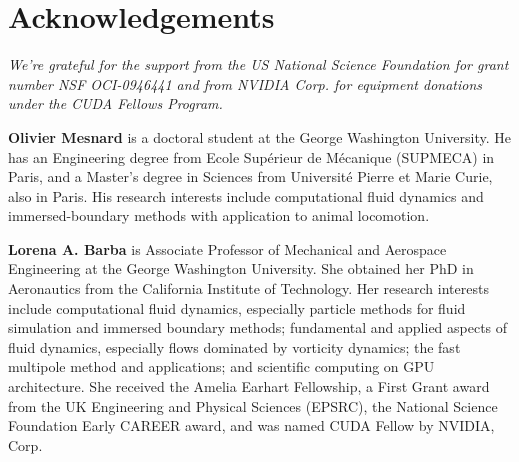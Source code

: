 \documentclass[9pt,twocolumn,twoside]{article}
\newlength{\up}
\begin{document}
\section*{Acknowledgements}
\vspace{\up}

{\sf \emph{We're grateful for the support from the US National Science Foundation for grant number NSF OCI-0946441 and from NVIDIA Corp. for equipment donations under the CUDA Fellows Program.}

\bigskip

}




\vspace{1cm}

\small
{\sf 


\noindent \textbf{Olivier Mesnard} is a doctoral student at the George Washington University. He has an Engineering degree from Ecole Sup{\'e}rieur de M{\'e}canique (SUPMECA) in Paris, and a Master's degree in Sciences from Universit{\'e} Pierre et Marie Curie, also in Paris.
His research interests include computational fluid dynamics and immersed-boundary methods with application to animal locomotion.
\bigskip

\noindent\textbf{Lorena A. Barba} is Associate Professor of Mechanical and Aerospace Engineering at the George Washington University.
She obtained her PhD in Aeronautics from the California Institute of Technology.
Her research interests include computational fluid dynamics, especially particle methods for fluid simulation and immersed boundary methods; fundamental and applied aspects of fluid dynamics, especially flows dominated by vorticity dynamics; the fast multipole method and applications; and scientific computing on GPU architecture. 
She received the Amelia Earhart Fellowship, a First Grant award from the UK Engineering and Physical Sciences (EPSRC), the National Science Foundation Early CAREER award, and was named CUDA Fellow by NVIDIA, Corp.
}
\end{document}
